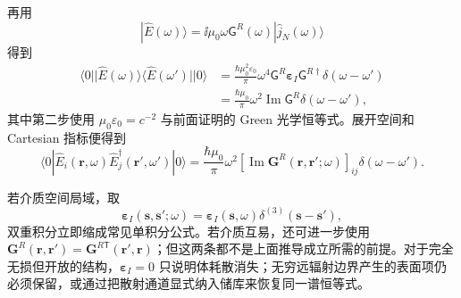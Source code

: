 \begin{derivation}
再用
\[
|\hat E(\omega)\rangle
=\ii\mu_0\omega\mathsf G^R(\omega)|\hat j_N(\omega)\rangle
\]
得到
\begin{align*}
\langle0|
|\hat E(\omega)\rangle\langle\hat E(\omega')|
|0\rangle
&=\frac{\hbar\mu_0^2\varepsilon_0}{\pi}\omega^4
\mathsf G^R\boldsymbol\varepsilon_I\mathsf G^{R\dagger}
\delta(\omega-\omega')\\
&=\frac{\hbar\mu_0}{\pi}\omega^2
\operatorname{Im}\mathsf G^R
\delta(\omega-\omega'),
\end{align*}
其中第二步使用
$\mu_0\varepsilon_0=c^{-2}$ 与前面证明的 Green 光学恒等式。展开空间和 Cartesian 指标便得到
\[
\boxed{
\langle0|
\hat E_i(\mathbf r,\omega)
\hat E_j^\dagger(\mathbf r',\omega')
|0\rangle
=\frac{\hbar\mu_0}{\pi}\omega^2
[\operatorname{Im}\mathbf G^R(\mathbf r,\mathbf r';\omega)]_{ij}
\delta(\omega-\omega').}
\]

若介质空间局域，取
\[
\boldsymbol\varepsilon_I(\mathbf s,\mathbf s';\omega)
=\boldsymbol\varepsilon_I(\mathbf s,\omega)
\delta^{(3)}(\mathbf s-\mathbf s'),
\]
双重积分立即缩成常见单积分公式。若介质互易，还可进一步使用
$\mathbf G^R(\mathbf r,\mathbf r')=\mathbf G^{R\mathsf T}(\mathbf r',\mathbf r)$；但这两条都不是上面推导成立所需的前提。对于完全无损但开放的结构，$\boldsymbol\varepsilon_I=0$ 只说明体耗散消失；无穷远辐射边界产生的表面项仍必须保留，或通过把散射通道显式纳入储库来恢复同一谱恒等式。
\end{derivation}



